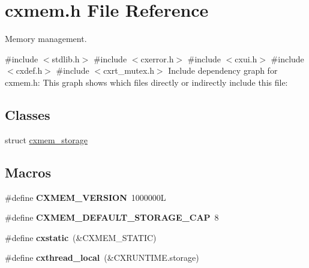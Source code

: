 \hypertarget{a00017}{}\section{cxmem.\+h File Reference}
\label{a00017}


Memory management.  


{\ttfamily \#include $<$stdlib.\+h$>$}\newline
{\ttfamily \#include $<$cxerror.\+h$>$}\newline
{\ttfamily \#include $<$cxui.\+h$>$}\newline
{\ttfamily \#include $<$cxdef.\+h$>$}\newline
{\ttfamily \#include $<$cxrt\+\_\+mutex.\+h$>$}\newline
Include dependency graph for cxmem.\+h\+:
This graph shows which files directly or indirectly include this file\+:
\subsection*{Classes}
\begin{DoxyCompactItemize}
\item 
struct \hyperlink{a00056}{cxmem\+\_\+storage}
\end{DoxyCompactItemize}
\subsection*{Macros}
\begin{DoxyCompactItemize}
\item 
\mbox{\label{a00017_a71a23f5cbe64e9b426aabef1e04485a1}} 
\#define {\bfseries C\+X\+M\+E\+M\+\_\+\+V\+E\+R\+S\+I\+ON}~1000000L
\item 
\mbox{\label{a00017_ab3c2fc6fb7e39deb7335561f528e0c0c}} 
\#define {\bfseries C\+X\+M\+E\+M\+\_\+\+D\+E\+F\+A\+U\+L\+T\+\_\+\+S\+T\+O\+R\+A\+G\+E\+\_\+\+C\+AP}~8
\item 
\mbox{\label{a00017_a5707b6d44fd77907d5f2acea86cb40bb}} 
\#define {\bfseries cxstatic}~(\&C\+X\+M\+E\+M\+\_\+\+S\+T\+A\+T\+IC)
\item 
\mbox{\label{a00017_a2ab107701ba86364a8b580c2ed01881f}} 
\#define {\bfseries cxthread\+\_\+local}~(\&C\+X\+R\+U\+N\+T\+I\+M\+E.\+storage)
\end{DoxyCompactItemize}
